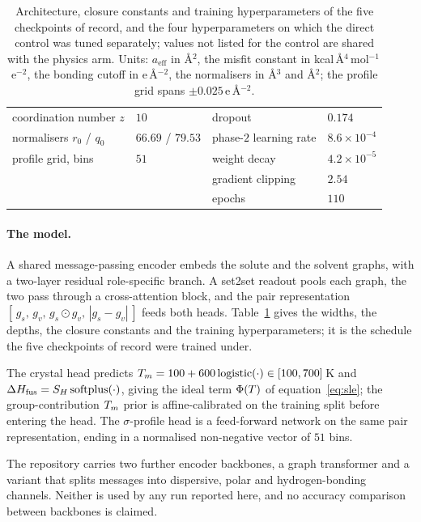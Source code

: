 \begin{table}[t]
{\begin{tabular}{@{}llll@{}}
coordination number $z$         & $10$            & dropout                                & $0.174$ \\
normalisers $r_0$ / $q_0$       & $66.69$ / $79.53$ & phase-$2$ learning rate              & $8.6\times10^{-4}$ \\
profile grid, bins              & $51$            & weight decay                           & $4.2\times10^{-5}$ \\
                                &                 & gradient clipping                      & $2.54$ \\
                                &                 & epochs                                 & $110$ \\
\bottomrule
\end{tabular}}
\caption{Architecture, closure constants and training hyperparameters of the five checkpoints of
record, and the four hyperparameters on which the direct control was tuned separately; values not
listed for the control are shared with the physics arm. Units: $a_{\mathrm{eff}}$ in \AA$^2$, the
misfit constant in kcal\,\AA$^4$\,mol$^{-1}$\,e$^{-2}$, the bonding cutoff in e\,\AA$^{-2}$, the
normalisers in \AA$^3$ and \AA$^2$; the profile grid spans $\pm0.025$\,e\,\AA$^{-2}$.}
\label{tab:si-hyper}
\end{table}

\paragraph{The model.}
A shared message-passing encoder embeds the solute and the solvent graphs, with a two-layer
residual role-specific branch. A set2set readout pools each graph, the two pass through a
cross-attention block, and the pair representation
$[\,g_s,\,g_v,\,g_s\!\odot g_v,\,|g_s-g_v|\,]$ feeds both heads. Table~\ref{tab:si-hyper} gives the
widths, the depths, the closure constants and the training hyperparameters; it is the schedule the
five checkpoints of record were trained under.

The crystal head predicts $T_m=100+600\,\mathrm{logistic}(\cdot)\in[100,700]$\,K and
$\Delta H_{\mathrm{fus}}=S_H\,\mathrm{softplus}(\cdot)$, giving the ideal term $\Phi(T)$ of
equation~\eqref{eq:sle}; the group-contribution $T_m$ prior is affine-calibrated on the training
split before entering the head. The $\sigma$-profile head is a feed-forward network on the same
pair representation, ending in a normalised non-negative vector of $51$ bins.

The repository carries two further encoder backbones, a graph transformer and a variant that splits
messages into dispersive, polar and hydrogen-bonding channels. Neither is used by any run reported
here, and no accuracy comparison between backbones is claimed.

